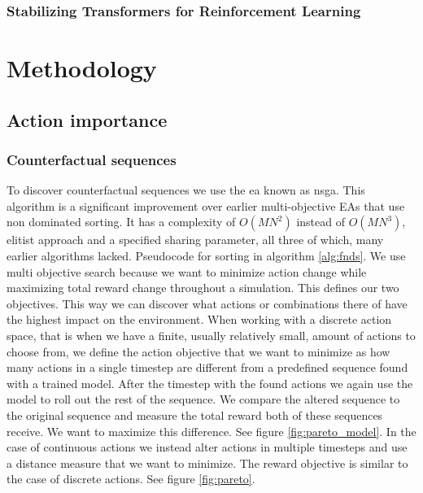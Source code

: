 \documentclass[UKenglish]{uiomasterthesis}
\begin{document}
\subsection{Stabilizing Transformers for Reinforcement Learning}


\medskip
\chapter{Methodology}

\section{Action importance}
\subsection{Counterfactual sequences}
\label{sec:counterfactual}
To discover counterfactual sequences we use the \ac{ea} known as \ac{nsga}. This algorithm is a significant improvement over earlier multi-objective EAs that use non dominated sorting. It has a complexity of $O(MN^2)$ instead of $O(MN^3)$, elitist approach and a specified sharing parameter, all three of which, many earlier algorithms lacked. \cite{Deb2001AFA} Pseudocode for sorting in algorithm \ref{alg:fnds}. 
We use multi objective search because we want to minimize action change while maximizing total reward change throughout a simulation. This defines our two objectives. This way we can discover what actions or combinations there of have the highest impact on the environment. When working with a discrete action space, that is when we have a finite, usually relatively small, amount of actions to choose from, we define the action objective that we want to minimize as how many actions in a single timestep are different from a predefined sequence found with a trained model. After the timestep with the found actions we again use the model to roll out the rest of the sequence. We compare the altered sequence to the original sequence and measure the total reward both of these sequences receive. We want to maximize this difference. See figure \ref{fig:pareto_model}. 
In the case of continuous actions we instead alter actions in multiple timesteps and use a distance measure that we want to minimize. The reward objective is similar to the case of discrete actions. See figure \ref{fig:pareto}.
\end{document}
